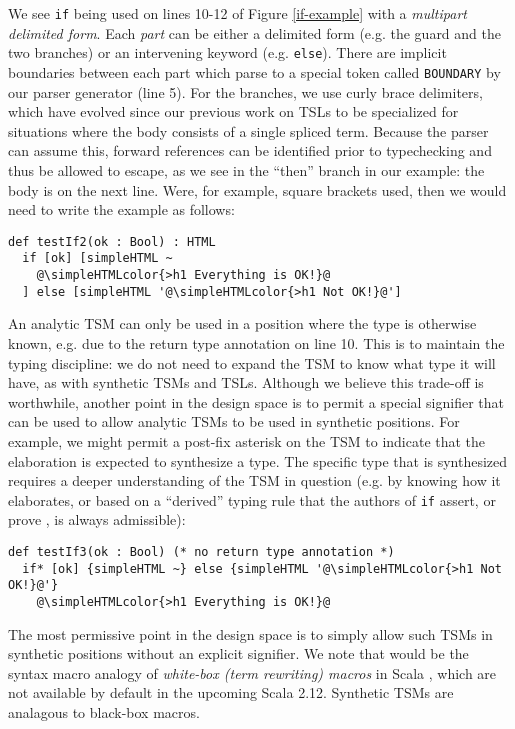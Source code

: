 \documentclass{sig-alternate}
\newcommand{\simpleHTMLcolor}[1]{\textcolor[HTML]{7D5100}{#1}}
\begin{document}
We see \verb|if| being used on lines 10-12 of Figure \ref{if-example} with a \emph{multipart delimited form}. Each \emph{part} can be either a delimited form (e.g. the guard and the two branches) or an intervening keyword (e.g. \verb|else|). There are implicit boundaries between each part which parse to  a special token called \verb|BOUNDARY| by our parser generator (line 5). For the branches, we use curly brace delimiters, which have evolved since our previous work on TSLs to be specialized for situations where the body consists of a single spliced term. Because the parser can assume this, forward references can be identified prior to typechecking and thus be allowed to escape, as we see in the ``then'' branch in our example: the body is on the next line. Were, for example, square brackets used, then we would need to write the example as follows:

\begin{lstlisting}[style=wyvern]
def testIf2(ok : Bool) : HTML
  if [ok] [simpleHTML ~
    @\simpleHTMLcolor{>h1 Everything is OK!}@
  ] else [simpleHTML '@\simpleHTMLcolor{>h1 Not OK!}@']
\end{lstlisting}

An analytic TSM can only be used in a position where the type is otherwise known, e.g. due to the return type annotation on line 10. This is to maintain the typing discipline: we do not need to expand the TSM to know what type it will have, as with synthetic TSMs and TSLs. Although we believe this trade-off is worthwhile, another point in the design space is to permit a special signifier that can be used to allow analytic TSMs to be used in synthetic positions. For example, we might permit a post-fix asterisk on the TSM to indicate that the elaboration is expected to synthesize a type. The specific type that is synthesized requires a deeper understanding of the TSM in question (e.g. by knowing how it elaborates, or based on a ``derived'' typing rule that the authors of \verb|if| assert, or prove \cite{conf/icfp/LorenzenE13}, is always admissible):

\begin{lstlisting}[style=wyvern]
def testIf3(ok : Bool) (* no return type annotation *)
  if* [ok] {simpleHTML ~} else {simpleHTML '@\simpleHTMLcolor{>h1 Not OK!}@'}
    @\simpleHTMLcolor{>h1 Everything is OK!}@
\end{lstlisting}

The most permissive point in the design space is to simply allow such TSMs in synthetic positions without an explicit signifier. We note that would be the syntax macro analogy of \emph{white-box (term rewriting) macros} in Scala \cite{ScalaMacros2013}, which are not  available by default in the upcoming Scala 2.12. Synthetic TSMs are analagous to black-box macros. 
\end{document}
